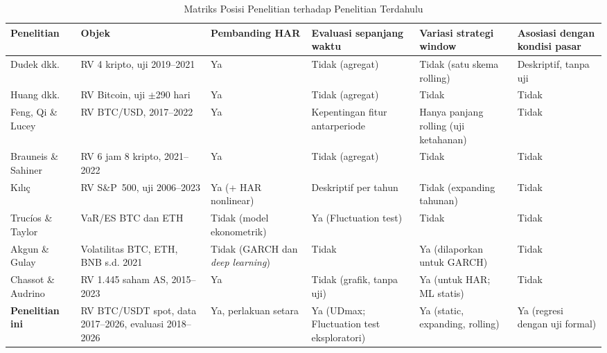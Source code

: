 \begin{table}[htbp]
  \caption{Matriks Posisi Penelitian terhadap Penelitian Terdahulu}
  \label{tab:posisi}
  \centering
  \begingroup
  \footnotesize
  \setlength{\tabcolsep}{3pt}
  \begin{tabular}{|>{\raggedright\arraybackslash}p{}%
                  |>{\raggedright\arraybackslash}p{}%
                  |>{\raggedright\arraybackslash}p{}%
                  |>{\raggedright\arraybackslash}p{}%
                  |>{\raggedright\arraybackslash}p{}%
                  |>{\raggedright\arraybackslash}p{}|}
    \hline
    \textbf{Penelitian} & \textbf{Objek} & \textbf{Pembanding HAR} &
    \textbf{Evaluasi sepanjang waktu} & \textbf{Variasi strategi window} &
    \textbf{Asosiasi dengan kondisi pasar} \\
    \hline
    Dudek dkk. \cite{dudek2024} & RV 4 kripto, uji 2019--2021 & Ya &
    Tidak (agregat) & Tidak (satu skema rolling) & Deskriptif, tanpa uji \\
    \hline
    Huang dkk. \cite{huang2024} & RV Bitcoin, uji $\pm$290 hari & Ya &
    Tidak (agregat) & Tidak & Tidak \\
    \hline
    Feng, Qi \& Lucey \cite{feng2024ml} & RV BTC/USD, 2017--2022 & Ya &
    Kepentingan fitur antarperiode & Hanya panjang rolling (uji ketahanan) &
    Tidak \\
    \hline
    Brauneis \& Sahiner \cite{brauneis2026} & RV 6 jam 8 kripto, 2021--2022 &
    Ya & Tidak (agregat) & Tidak & Tidak \\
    \hline
    Kılıç \cite{kilic2025} & RV S\&P~500, uji 2006--2023 & Ya (+ HAR
    nonlinear) & Deskriptif per tahun & Tidak (expanding tahunan) & Tidak \\
    \hline
    Trucíos \& Taylor \cite{trucios2023} & VaR/ES BTC dan ETH &
    Tidak (model ekonometrik) & Ya (Fluctuation test) & Tidak & Tidak \\
    \hline
    Akgun \& Gulay \cite{akgun2025} & Volatilitas BTC, ETH, BNB s.d. 2021 &
    Tidak (GARCH dan \textit{deep learning}) & Tidak &
    Ya (dilaporkan untuk GARCH) & Tidak \\
    \hline
    Chassot \& Audrino \cite{chassot2026} & RV 1.445 saham AS, 2015--2023 &
    Ya & Tidak (grafik, tanpa uji) & Ya (untuk HAR; ML statis) & Tidak \\
    \hline
    \textbf{Penelitian ini} & RV BTC/USDT spot, data 2017--2026, evaluasi 2018--2026 &
    Ya, perlakuan setara & Ya (UDmax; Fluctuation test eksploratori) &
    Ya (static, expanding, rolling) & Ya (regresi dengan uji formal) \\
    \hline
  \end{tabular}
  \endgroup
\end{table}

